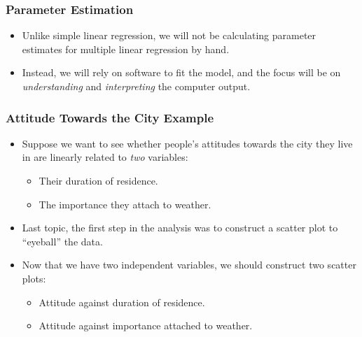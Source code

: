 \documentclass[14pt]{beamer}
\begin{document}
\begin{frame}
	\frametitle{Parameter Estimation}
	
	\begin{itemize}[label={\color{blue}$\blacktriangleright$}]
		\item Unlike simple linear regression, we will not be calculating parameter estimates for multiple linear regression by hand.
		
		\item Instead, we will rely on software to fit the model, and the focus will be on \textit{understanding} and \textit{interpreting} the computer output.
		
	\end{itemize}
	
\end{frame}
\begin{frame}
	\frametitle{Attitude Towards the City Example}
	
	\begin{itemize}[label={\color{blue}$\blacktriangleright$}]
		\item Suppose we want to see whether people's attitudes towards the city they live in are linearly related to \textit{two} variables:
		\begin{itemize}[label={\color{blue}$\blacktriangleright$}]
			\item Their duration of residence.
			\item The importance they attach to weather.
		\end{itemize}
		
		\item Last topic, the first step in the analysis was to construct a scatter plot to ``eyeball'' the data.
		
		\item Now that we have two independent variables, we should construct two scatter plots:
		\begin{itemize}[label={\color{blue}$\blacktriangleright$}]
			\item Attitude against duration of residence.
			\item Attitude against importance attached to weather.
		\end{itemize}
		
	\end{itemize}
	
\end{frame}
\end{document}
